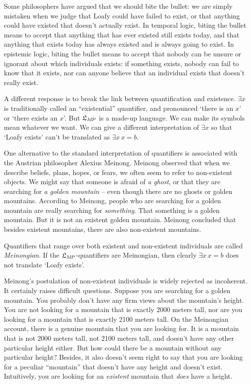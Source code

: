 Some philosophers have argued that we should bite the bullet: we are simply
mistaken when we judge that Loafy could have failed to exist, or that anything
could have existed that doesn't actually exist. In temporal logic, biting the
bullet means to accept that anything that has ever existed still exists today,
and that anything that exists today has always existed and is always going to
exist. In epistemic logic, biting the bullet means to accept that nobody can be
unsure or ignorant about which individuals exists: if something exists, nobody
can fail to know that it exists, nor can anyone believe that an individual
exists that doesn't really exist.


A different response is to break the link between quantification and
existence. $\exists x$ is traditionally called an ``existential'' quantifier,
and pronounced `there is an $x$' or `there exists an $x$'. But $\mathfrak{L}_{M\!P}$ is a
made-up language. We can make its symbols mean whatever we want. We can give a
different interpretation of $\exists x$ so that `Loafy exists' can't be
translated as $\exists x\, x\!=\!b$.

One alternative to the standard interpretation of quantifiers is associated with
the Austrian philosopher Alexius Meinong. Meinong observed that when we describe
beliefs, plans, hopes, or fears, we often seem to refer to non-existent objects.
We might say that someone is afraid of \emph{a ghost}, or that they are
searching for \emph{a golden mountain} -- even though there are no ghosts or
golden mountains. According to Meinong, people who are searching for a golden
mountain are really searching for \emph{something}. That something is a golden
mountain. But it is not an existent golden mountain. Meinong concluded that
besides existent mountains, there are also non-existent mountains.

Quantifiers that range over both existent and non-existent individuals are
called \emph{Meinongian}. If the $\mathfrak{L}_{M\!P}$-quantifiers are Meinongian, then
clearly $\exists x\, x\!=\!b$ does not translate `Loafy exists'.

Meinong's postulation of non-existent individuals is widely rejected as
incoherent. It certainly raises difficult questions. Suppose you are
searching for a golden mountain. You probably don't have any firm views about
the mountain's height. You are not looking for a mountain that is exactly 2000
meters tall, nor are you looking for a mountain that is exactly 2100 meters
tall. On the Meinongian account, there is a genuine mountain that you
are looking for. It is a mountain that is not 2000 meters tall, not 2100 meters
tall, and doesn't have any other particular height either. But how could there
be a mountain without any particular height? Besides, it also doesn't seem right
to say that you are looking for a peculiar ``mountain'' that doesn't have any
height and doesn't exist. Intuitively, you are looking for an \emph{existent}
mountain that \emph{does} have a height.

